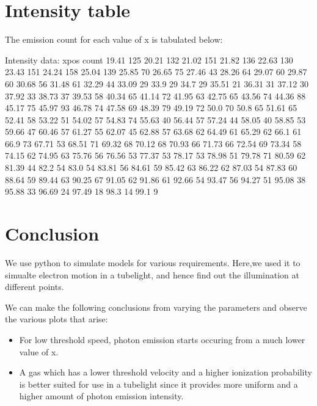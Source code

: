 \documentclass[11pt, a4paper]{article}
\begin{document}
\section*{Intensity table}
The emission count for each value of x is tabulated below:
\begin{verbatim*}
Intensity data:
xpos	count
19.41	125
20.21	132
21.02	151
21.82	136
22.63	130
23.43	151
24.24	158
25.04	139
25.85	70
26.65	75
27.46	43
28.26	64
29.07	60
29.87	60
30.68	56
31.48	61
32.29	44
33.09	29
33.9	29
34.7	29
35.51	21
36.31	31
37.12	30
37.92	33
38.73	37
39.53	58
40.34	65
41.14	72
41.95	63
42.75	65
43.56	74
44.36	88
45.17	75
45.97	93
46.78	74
47.58	69
48.39	79
49.19	72
50.0	70
50.8	65
51.61	65
52.41	58
53.22	51
54.02	57
54.83	74
55.63	40
56.44	57
57.24	44
58.05	40
58.85	53
59.66	47
60.46	57
61.27	55
62.07	45
62.88	57
63.68	62
64.49	61
65.29	62
66.1	61
66.9	73
67.71	53
68.51	71
69.32	68
70.12	68
70.93	66
71.73	66
72.54	69
73.34	58
74.15	62
74.95	63
75.76	56
76.56	53
77.37	53
78.17	53
78.98	51
79.78	71
80.59	62
81.39	44
82.2	54
83.0	54
83.81	56
84.61	59
85.42	63
86.22	62
87.03	54
87.83	60
88.64	59
89.44	63
90.25	67
91.05	62
91.86	61
92.66	54
93.47	56
94.27	51
95.08	38
95.88	33
96.69	24
97.49	18
98.3	14
99.1	9
\end{verbatim*}

\section*{Conclusion}
We use python to simulate models for various requirements. Here,we used it to simualte electron motion in a tubelight, and hence find out the illumination
at different points.

We can make the following conclusions from varying the parameters and observe the various plots that arise:
\begin{itemize}
\item For low threshold speed, photon emission starts occuring from a much lower value of x.
\item A gas which has a lower threshold velocity and a higher ionization probability is better suited for use in a tubelight since it provides more uniform and a higher amount of photon emission intensity.

\end{itemize}
\end{document}
